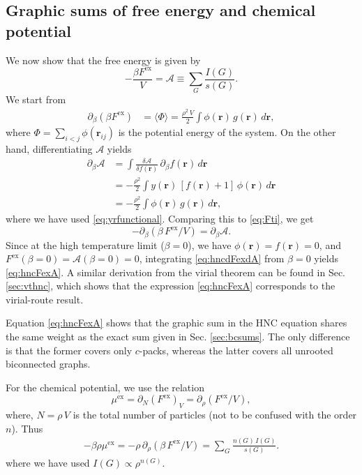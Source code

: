 \documentclass[aip,jcp,reprint,superscriptaddress]{revtex4-1}
\newcommand{\vct}[1]{\mathbf{#1}}
\providecommand{\vr}{} %
\renewcommand{\vr}{\vct{r}}
\newcommand{\supex}[1]{ { { #1 }^{ \mathrm{ex} } } }
\newcommand{\Fex}{\supex{F}}
\newcommand{\muex}{\supex{\mu}}
\newcommand{\A}{\mathcal{A}}
\begin{document}
\subsection{\label{sec:hncFex}Graphic sums of free energy and chemical potential}


We now show that the free energy is given by\cite{morita1958, *morita1959, *morita1960}
\begin{equation}
  -\frac{ \beta \Fex }{V}
=
  \A \equiv \sum_G \frac{ I(G) }{ s(G) }.
\label{eq:hncFexA}
\end{equation}
%
We start from
\begin{align}
  \partial_\beta (\beta \Fex)
&=
 \langle \Phi \rangle
=
\frac{\rho^2 \, V}{2} \int
  \phi(\vr) \, g(\vr) \, d\vr,
  \label{eq:Fti}
\end{align}
where $\Phi = \sum_{i < j} \phi(\vr_{ij})$
is the potential energy of the system.
%
On the other hand, differentiating $\A$ yields
\begin{align*}
  \partial_\beta \A
&=
  \int
  \frac{ \delta \A } { \delta f(\vr) }
  \,
  \partial_\beta f(\vr) \, d\vr
  \\
&=
  -\frac{\rho^2} {2}
  \int
  y(\vr) \, [f(\vr) + 1]
  \, \phi(\vr) \, d\vr
  \\
&=
  -\frac{\rho^2} {2}
  \int \phi(\vr) \, g(\vr) \, d\vr,
\end{align*}
where we have used \eqref{eq:yrfunctional}.
%
Comparing this to \eqref{eq:Fti}, we get
\begin{equation}
  -\partial_\beta(\beta \, \Fex/V) = \partial_\beta \A.
  \label{eq:hncdFexdA}
\end{equation}
Since at the high temperature limit ($\beta = 0$),
we have $\phi(\vr) = f(\vr) = 0$,
and $\Fex(\beta = 0) = \A(\beta = 0) = 0$,
%
integrating \eqref{eq:hncdFexdA} from $\beta = 0$
yields \eqref{eq:hncFexA}.
%
A similar derivation from the virial theorem
can be found in Sec. \ref{sec:vthnc},
which shows that the expression \eqref{eq:hncFexA}
corresponds to the virial-route result.

Equation \eqref{eq:hncFexA} shows that the graphic sum
in the HNC equation shares the same weight as
the exact sum given in Sec. \ref{sec:bcsums}.
%
The only difference is that the former covers only $c$-packs,
whereas the latter covers all unrooted biconnected graphs.


For the chemical potential, we use the relation
\begin{equation}
  \muex = \partial_N(\Fex)_V = \partial_\rho(\Fex/V),
  \label{eq:muexdFex}
\end{equation}
where,
$N = \rho \, V$
is the total number of particles
(not to be confused with the order $n$).
%
Thus
%
\begin{align}
    - \beta \rho \muex
  =
  -\rho \, \partial_\rho(\beta \, \Fex/V)
  =
    \sum_G \frac{ n(G) \, I(G) } { s(G) }.
\label{eq:hncmugsum}
\end{align}
where we have used $I(G) \propto \rho^{n(G)}$.
\end{document}
